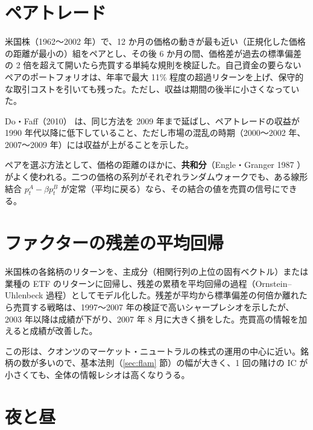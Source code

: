 \section{ペアトレード}

\begin{paperbox}
米国株（1962〜2002 年）で、12 か月の価格の動きが最も近い（正規化した価格の距離が最小の）組をペアとし、その後 6 か月の間、価格差が過去の標準偏差の 2 倍を超えて開いたら売買する単純な規則を検証した。自己資金の要らないペアのポートフォリオは、年率で最大 11\% 程度の超過リターンを上げ、保守的な取引コストを引いても残った。ただし、収益は期間の後半に小さくなっていた。
\end{paperbox}

Do・Faff（2010）\cite{dofaff2010} は、同じ方法を 2009 年まで延ばし、ペアトレードの収益が 1990 年代以降に低下していること、ただし市場の混乱の時期（2000〜2002 年、2007〜2009 年）には収益が上がることを示した。

ペアを選ぶ方法として、価格の距離のほかに、\textbf{共和分}（Engle・Granger 1987 \cite{englegranger1987}）がよく使われる。二つの価格の系列がそれぞれランダムウォークでも、ある線形結合 $p^A_t - \beta p^B_t$ が定常（平均に戻る）なら、その結合の値を売買の信号にできる。

\section{ファクターの残差の平均回帰}

\begin{paperbox}
米国株の各銘柄のリターンを、主成分（相関行列の上位の固有ベクトル）または業種の ETF のリターンに回帰し、残差の累積を平均回帰の過程（Ornstein--Uhlenbeck 過程）としてモデル化した。残差が平均から標準偏差の何倍か離れたら売買する戦略は、1997〜2007 年の検証で高いシャープレシオを示したが、2003 年以降は成績が下がり、2007 年 8 月に大きく損をした。売買高の情報を加えると成績が改善した。
\end{paperbox}

この形は、クオンツのマーケット・ニュートラルの株式の運用の中心に近い。銘柄の数が多いので、基本法則（\ref{sec:flam} 節）の幅が大きく、1 回の賭けの IC が小さくても、全体の情報レシオは高くなりうる。

\section{夜と昼}

